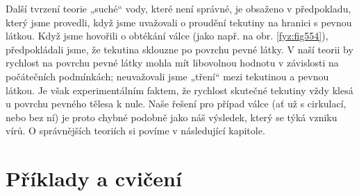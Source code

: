     Další tvrzení teorie „suché“ vody, které není správné, je obsaženo v předpokladu, který jsme 
    provedli, když jsme uvažovali o proudění tekutiny na hranici s pevnou látkou. Když jsme 
    hovořili o obtékání válce (jako např. na obr. \ref{fyz:fig554}), předpokládali jsme, že 
    tekutina sklouzne po povrchu pevné látky. V naší teorii by rychlost na povrchu pevné látky 
    mohla mít libovolnou hodnotu v závislosti na počátečních podmínkách; neuvažovali jsme „tření“ 
    mezi tekutinou a pevnou látkou. Je však experimentálním faktem, že rychlost skutečné tekutiny 
    vždy klesá u povrchu pevného tělesa k nule. Naše řešení pro případ válce (ať už s cirkulací, 
    nebo bez ní) je proto chybné podobně jako náš výsledek, který se týká vzniku vírů. O 
    správnějších teoriích si povíme v následující kapitole.
    
  \section{Příklady a cvičení}\label{fyz:IIchapXLsecVI}
    

